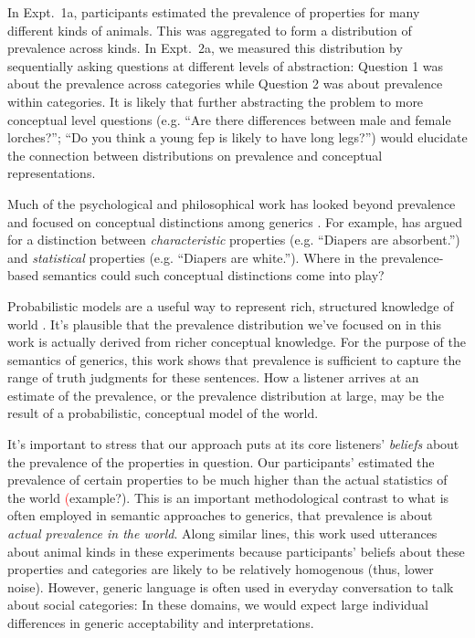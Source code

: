 \documentclass[10pt,letterpaper]{article}
\newcommand{\red}[1]{\textcolor{Red}{#1}}
\begin{document}
In Expt.~1a, participants estimated the prevalence of properties for many different kinds of animals. This was aggregated to form a distribution of prevalence across kinds.
In Expt.~2a, we measured this distribution by sequentially asking questions at different levels of abstraction: Question 1 was about the prevalence across categories while Question 2 was about prevalence within categories. 
It is likely that further abstracting the problem to more conceptual level questions (e.g. ``Are there differences between male and female lorches?''; ``Do you think a young fep is likely to have long legs?'') would elucidate the connection between distributions on prevalence and conceptual representations. 

Much of the psychological and philosophical work has looked beyond prevalence and focused on conceptual distinctions among generics \cite{Prasada2013, Leslie2008}. For example, \citeauthor{Prasada2013} has argued for a distinction between \emph{characteristic} properties (e.g. ``Diapers are absorbent.'') and \emph{statistical} properties (e.g. ``Diapers are white.''). Where in the prevalence-based semantics could such conceptual distinctions come into play?

Probabilistic models are a useful way to represent rich, structured knowledge of world \cite{Goodmanconcepts}. It's plausible that the prevalence distribution we've focused on in this work is actually derived from richer conceptual knowledge. For the purpose of the semantics of generics, this work shows that prevalence is sufficient to capture the range of truth judgments for these sentences. How a listener arrives at an estimate of the prevalence, or the prevalence distribution at large, may be the result of a probabilistic, conceptual model of the world. 

It's important to stress that our approach puts at its core listeners' \emph{beliefs} about the prevalence of the properties in question. 
Our participants' estimated the prevalence of certain properties to be much higher than the actual statistics of the world \red(example?).
This is an important methodological contrast to what is often employed in semantic approaches to generics, that prevalence is about \emph{actual prevalence in the world}. 
Along similar lines, this work used utterances about animal kinds in these experiments because participants' beliefs about these properties and categories are likely to be relatively homogenous (thus, lower noise). However, generic language is often used in everyday conversation to talk about social categories: In these domains, we would expect large individual differences in generic acceptability and interpretations.
\end{document}
